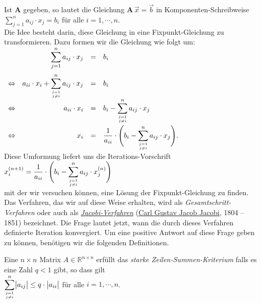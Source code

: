 Ist $\mathbf{A}$ gegeben, so lautet die Gleichung $\mathbf{A}\,\vec{x} = \vec{b}$ in Komponenten-Schreibweise 
\\[0.2cm]
\hspace*{1.3cm}
$\displaystyle \sum\limits_{j=1}^n a_{ij} \cdot  x_j = b_i$ \quad f\"ur alle $i = 1,\cdots,n$.
\\[0.2cm]
Die Idee besteht darin, diese Gleichung in eine Fixpunkt-Gleichung zu transformieren.
Dazu formen wir die Gleichung wie folgt um: 
\\[0.3cm]
\hspace*{1.3cm}
$
\begin{array}{crcl}
                &  \displaystyle \sum\limits_{j=1}^n a_{ij} \cdot  x_j & = & b_i \\[0.6cm]
\Leftrightarrow & \displaystyle a_{ii} \cdot  x_i + \sum\limits_{j=1 \atop j \not= i}^n a_{ij} \cdot  x_j & = & b_i \\[0.2cm]
\Leftrightarrow & a_{ii} \cdot  x_i & = & \displaystyle b_i - \sum\limits_{j=1 \atop j \not= i}^n a_{ij} \cdot  x_j \\[0.6cm]
\Leftrightarrow & x_i & = & \displaystyle \frac{1}{a_{ii}} \cdot  \Biggl( b_i - \sum\limits_{j=1 \atop j \not= i}^n a_{ij} \cdot  x_j \Biggr). \\[0.3cm]
\end{array}
$
\\[0.2cm]
Diese Umformung liefert uns die Iterations-Vorschrift
\\[0.2cm]
\hspace*{1.3cm}
$x^{(n+1)}_i = \displaystyle \frac{1}{a_{ii}} \cdot  \Biggl( b_i - \sum\limits_{j=1 \atop j \not= i}^n a_{ij} \cdot  x^{(n)}_j \Biggr)$
\\[0.2cm]
mit der wir versuchen k\"onnen, eine L\"osung der Fixpunkt-Gleichung zu finden.
Das Verfahren, das wir auf diese Weise erhalten, wird als \emph{Gesamtschritt-Verfahren}
oder auch als \href{https://de.wikipedia.org/wiki/Jacobi-Verfahren}{\emph{Jacobi-Verfahren}} 
(\href{https://de.wikipedia.org/wiki/Carl_Gustav_Jacob_Jacobi}{Carl Gustav Jacob Jacobi}, 1804 -- 1851) bezeichnet.
Die Frage lautet jetzt, wann die durch dieses Verfahren definierte Iteration konvergiert.
Um eine positive Antwort auf diese Frage geben zu k\"onnen, ben\"otigen wir die folgenden Definitionen.

\begin{Definition}
  Eine $n\times n$ Matrix $A \in \mathbb{R}^{n\times n}$ erf\"ullt das \emph{starke Zeilen-Summen-Kriterium} 
 falls es eine Zahl $q < 1$ gibt, so dass gilt
  \\[0.2cm]
  \hspace*{1.3cm}
  $\displaystyle\sum\limits_{j=1 \atop j \not= i}^n \bigl| a_{ij} \bigr| \leq q \cdot
  \bigl| a_{ii} \bigr|$ \quad f\"ur alle $i = 1,\cdots,n$.
\end{Definition}

